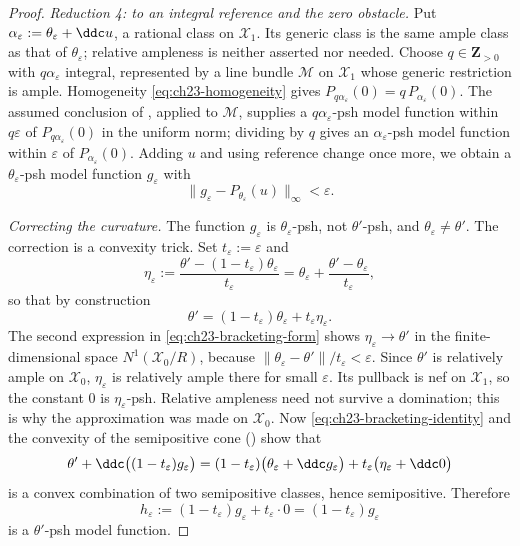 \begin{proof}
\emph{Reduction 4: to an integral reference and the zero obstacle.}
Put $\alpha_\varepsilon:=\theta_\varepsilon+\ddc u$, a rational class on
$\mathcal X_1$.  Its generic class is the same ample class as that of
$\theta_\varepsilon$; relative ampleness is neither asserted nor needed.
Choose $q\in\mathbf Z_{>0}$ with $q\alpha_\varepsilon$ integral,
represented by a line bundle $\mathcal M$ on $\mathcal X_1$ whose
generic restriction is ample.  Homogeneity
\eqref{eq:ch23-homogeneity} gives
$P_{q\alpha_\varepsilon}(0)=q\,P_{\alpha_\varepsilon}(0)$.  The assumed
conclusion of , applied to
$\mathcal M$, supplies a $q\alpha_\varepsilon$-psh model function within
$q\varepsilon$ of $P_{q\alpha_\varepsilon}(0)$ in the uniform norm;
dividing by $q$ gives an $\alpha_\varepsilon$-psh model function within
$\varepsilon$ of $P_{\alpha_\varepsilon}(0)$.  Adding $u$ and using
reference change once more, we obtain a $\theta_\varepsilon$-psh model
function $g_\varepsilon$ with
\begin{equation}\label{eq:ch23-rational-model-approximant}
       \|g_\varepsilon-P_{\theta_\varepsilon}(u)\|_\infty<\varepsilon.
\end{equation}

\emph{Correcting the curvature.}
The function $g_\varepsilon$ is $\theta_\varepsilon$-psh, not
$\theta'$-psh, and $\theta_\varepsilon\ne\theta'$.  The correction is a
convexity trick.  Set $t_\varepsilon:=\varepsilon$ and
\begin{equation}\label{eq:ch23-bracketing-form}
       \eta_\varepsilon
       :=\frac{\theta'-(1-t_\varepsilon)\theta_\varepsilon}
                    {t_\varepsilon}
        =\theta_\varepsilon
         +\frac{\theta'-\theta_\varepsilon}{t_\varepsilon},
\end{equation}
so that by construction
\begin{equation}\label{eq:ch23-bracketing-identity}
 \theta'=(1-t_\varepsilon)\theta_\varepsilon
        +t_\varepsilon\eta_\varepsilon .
\end{equation}
The second expression in \eqref{eq:ch23-bracketing-form} shows
$\eta_\varepsilon\to\theta'$ in the finite-dimensional space
$N^1(\mathcal X_0/R)$, because
$\|\theta_\varepsilon-\theta'\|/t_\varepsilon<\varepsilon$.  Since
$\theta'$ is relatively ample on $\mathcal X_0$,
$\eta_\varepsilon$ is relatively ample there for small $\varepsilon$.
Its pullback is nef on $\mathcal X_1$, so the constant $0$ is
$\eta_\varepsilon$-psh.  Relative ampleness need not survive a
domination; this is why the approximation was made on $\mathcal X_0$.  Now
\eqref{eq:ch23-bracketing-identity} and the convexity of the semipositive
cone () show that
\[
 \theta'+\ddc\bigl((1-t_\varepsilon)g_\varepsilon\bigr)
 =(1-t_\varepsilon)\bigl(\theta_\varepsilon+\ddc g_\varepsilon\bigr)
  +t_\varepsilon\bigl(\eta_\varepsilon+\ddc 0\bigr)
\]
is a convex combination of two semipositive classes, hence semipositive.
Therefore
\[
                   h_\varepsilon
                   :=(1-t_\varepsilon)g_\varepsilon
                    +t_\varepsilon\cdot 0
                   =(1-t_\varepsilon)g_\varepsilon
\]
is a $\theta'$-psh model function.


\end{proof}
